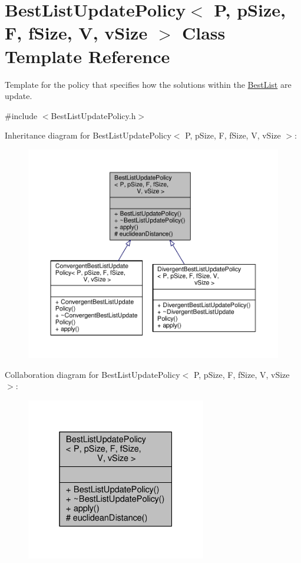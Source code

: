 \hypertarget{classBestListUpdatePolicy}{}\section{Best\+List\+Update\+Policy$<$ P, p\+Size, F, f\+Size, V, v\+Size $>$ Class Template Reference}
\label{classBestListUpdatePolicy}


Template for the policy that specifies how the solutions within the \hyperlink{classBestList}{Best\+List} are update.  




{\ttfamily \#include $<$Best\+List\+Update\+Policy.\+h$>$}



Inheritance diagram for Best\+List\+Update\+Policy$<$ P, p\+Size, F, f\+Size, V, v\+Size $>$\+:\nopagebreak
\begin{figure}[H]
\begin{center}
\leavevmode
\includegraphics[width=350pt]{classBestListUpdatePolicy__inherit__graph}
\end{center}
\end{figure}


Collaboration diagram for Best\+List\+Update\+Policy$<$ P, p\+Size, F, f\+Size, V, v\+Size $>$\+:\nopagebreak
\begin{figure}[H]
\begin{center}
\leavevmode
\includegraphics[width=223pt]{classBestListUpdatePolicy__coll__graph}
\end{center}
\end{figure}

